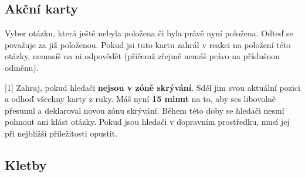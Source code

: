 \documentclass{book}
\def\timehidingmove/{15 minut}  %
\begin{document}
\subsection{Akční karty}

\begin{cards}
	\item {} Vyber otázku, která ještě nebyla položena či byla právě nyní položena. Odteď se považuje za již položenou. Pokud jsi tuto kartu zahrál v reakci na položení této otázky, nemusíš na ni odpovědět (přičemž zřejmě nemáš právo na příslušnou odměnu).

	\item {} Zahraj, pokud hledači \textbf{nejsou v zóně skrývání}. Sděl jim svou aktuální pozici a odhoď všechny karty z ruky. Máš nyní \textbf{\timehidingmove/} na to, aby ses libovolně přesunul a deklaroval novou zónu skrývání. Během této doby se hledači nesmí pohnout ani klást otázky. Pokud jsou hledači v dopravním prostředku, musí jej při nejbližší příležitosti opustit.

	\item {}

	\item {}
\end{cards}

\subsection{Kletby}\label{kletby}
\end{document}
